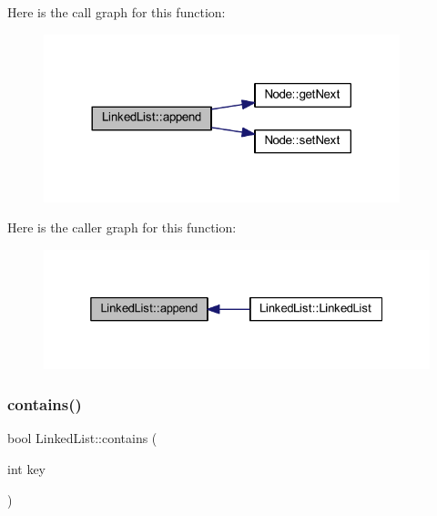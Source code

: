 Here is the call graph for this function\+:
\nopagebreak
\begin{figure}[H]
\begin{center}
\leavevmode
\includegraphics[width=293pt]{class_linked_list_a2e67fa8d36b83febafbd5f3801ec43db_cgraph}
\end{center}
\end{figure}
Here is the caller graph for this function\+:
\nopagebreak
\begin{figure}[H]
\begin{center}
\leavevmode
\includegraphics[width=325pt]{class_linked_list_a2e67fa8d36b83febafbd5f3801ec43db_icgraph}
\end{center}
\end{figure}
\mbox{\label{class_linked_list_ac2fac6f86f1891576b57c2866ff77803}} 
\subsubsection{\texorpdfstring{contains()}{contains()}}
{\footnotesize\ttfamily bool Linked\+List\+::contains (\begin{DoxyParamCaption}\item[{int}]{key }\end{DoxyParamCaption})}

